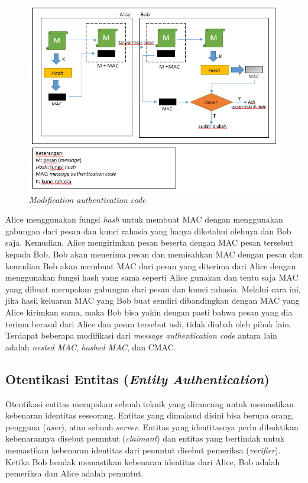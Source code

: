 \begin{figure}[H]
	\includegraphics[scale=0.7]{Gambar/MAC}
	\centering
	\caption{\textit{Modification authentication code}}\label{fig:MAC}
\end{figure}

Alice menggunakan fungsi \textit{hash} untuk membuat MAC dengan menggunakan gabungan dari pesan dan kunci rahasia yang hanya diketahui olehnya dan Bob saja. Kemudian, Alice mengirimkan pesan beserta dengan MAC pesan tersebut kepada Bob. Bob akan menerima pesan dan memisahkan MAC dengan pesan dan kemudian Bob akan membuat MAC dari pesan yang diterima dari Alice dengan menggunakan fungsi hash yang sama seperti Alice gunakan dan tentu saja MAC yang dibuat merupakan gabungan dari pesan dan kunci rahasia. Melalui cara ini, jika hasil keluaran MAC yang Bob buat sendiri dibandingkan dengan MAC yang Alice kirimkan sama, maka Bob bisa yakin dengan pasti bahwa pesan yang dia terima berasal dari Alice dan pesan tersebut asli, tidak diubah oleh pihak lain. Terdapat beberapa modifikasi dari \textit{message authentication code} antara lain adalah \textit{nested MAC}, \textit{hashed MAC}, dan CMAC. 

\subsection{Otentikasi Entitas (\textit{Entity Authentication})}
Otentikasi entitas merupakan sebuah teknik yang dirancang untuk memastikan kebenaran identitas seseorang. Entitas yang dimaksud disini bisa berupa orang, pengguna (\textit{user}), atau sebuah \textit{server}. Entitas yang identitasnya perlu dibuktikan kebenarannya disebut penuntut (\textit{claimant}) dan entitas yang bertindak untuk memastikan kebenaran identitas dari penuntut disebut pemeriksa (\textit{verifier}). Ketika Bob hendak memastikan kebenaran identitas dari Alice, Bob adalah pemeriksa dan Alice adalah penuntut.

